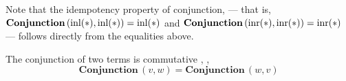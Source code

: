   Note that the idempotency property of conjunction, --- that is, $ \textbf{Conjunction} \, (\mathrm{inl}(*), \mathrm{inl}(*)) = \mathrm{inl}(*)$ and  $ \textbf{Conjunction} \, (\mathrm{inr}(*), \mathrm{inr}(*)) = \mathrm{inr}(*)$ ---   follows directly from the equalities above.


\begin{proposition} \label{lem:comm}
  The conjunction of two terms is commutative , \ie,
 $$ \textbf{Conjunction} \, (v,w) = \textbf{Conjunction} \, (w,v)  $$ 
\end{proposition}




